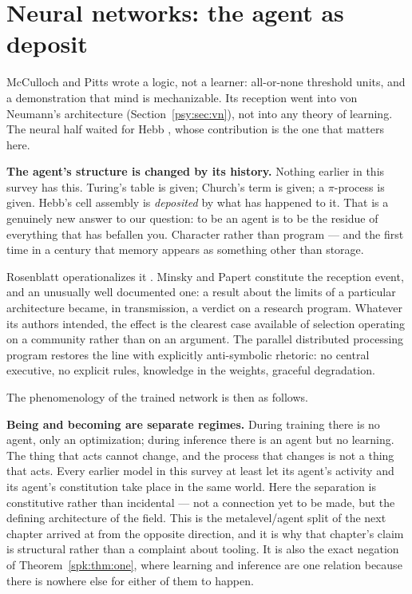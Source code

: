\section{Neural networks: the agent as deposit}
\label{psy:sec:nn}

McCulloch and Pitts \cite{mcp} wrote a logic, not a
learner: all-or-none threshold units, and a demonstration that mind
is mechanizable.
Its reception went into von Neumann's architecture
(Section~\ref{psy:sec:vn}), not into any theory of learning.
The neural half waited for Hebb \cite{hebb}, whose contribution is
the one that matters here.

\textbf{The agent's structure is changed by its history.}
Nothing earlier in this survey has this.
Turing's table is given; Church's term is given; a $\pi$-process is
given.
Hebb's cell assembly is \emph{deposited} by what has happened to it.
That is a genuinely new answer to our question: to be an agent is to
be the residue of everything that has befallen you.
Character rather than program --- and the first time in a century
that memory appears as something other than storage.

Rosenblatt operationalizes it \cite{rosenblatt1958}.
Minsky and Papert \cite{minsky1969} constitute the reception event,
and an unusually well documented one: a result about the limits of a
particular architecture became, in transmission, a verdict on a
research program.
Whatever its authors intended, the effect is the clearest case
available of selection operating on a community rather than on an
argument.
The parallel distributed processing program restores the line
\cite{rumelhart1986,pdp1986} with explicitly anti-symbolic rhetoric:
no central executive, no explicit rules, knowledge in the weights,
graceful degradation.

The phenomenology of the trained network is then as follows.

\textbf{Being and becoming are separate regimes.}
During training there is no agent, only an optimization; during
inference there is an agent but no learning.
The thing that acts cannot change, and the process that changes is
not a thing that acts.
Every earlier model in this survey at least let its agent's activity
and its agent's constitution take place in the same world.
Here the separation is constitutive rather than incidental --- not a
connection yet to be made, but the defining architecture of the
field.
This is the metalevel/agent split of the next chapter arrived at
from the opposite direction, and it is why that chapter's claim is
structural rather than a complaint about tooling.
It is also the exact negation of Theorem~\ref{spk:thm:one}, where
learning and inference are one relation because there is nowhere
else for either of them to happen.

